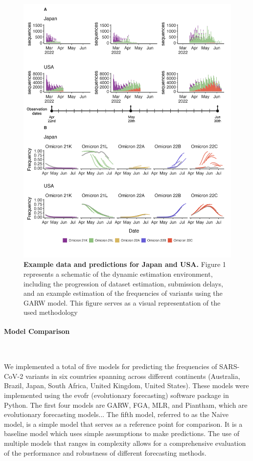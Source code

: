 \documentclass[11pt,oneside,letterpaper]{article}
\begin{document}
\begin{figure}[H]
	\centering
	\includegraphics[width=1.0\textwidth]{figures/Figure1Final.png}
	\caption{\textbf{Example data and predictions for Japan and USA.}
	Figure 1 represents a schematic of the dynamic estimation environment, including the progression of dataset estimation, submission delays, and an example estimation of the frequencies of variants using the GARW model. This figure serves as a visual representation of the used methodology
	}
	\label{Figure1Final}
\end{figure}





\paragraph{Model Comparison}\


We implemented a total of five models for predicting the frequencies of SARS-CoV-2 variants in six countries spanning across different continents (Australia, Brazil, Japan, South Africa, United Kingdom, United States).
These models were implemented using the evofr (evolutionary forecasting) software package in Python.
The first four models are GARW, FGA, MLR, and Piantham, which are evolutionary forecasting models... %
The fifth model, referred to as the Naive model, is a simple model that serves as a reference point for comparison.
It is a baseline model which uses simple assumptions to make predictions. 
The use of multiple models that ranges in complexity allows for a comprehensive evaluation of the performance and robustness of different forecasting methods.
\end{document}
